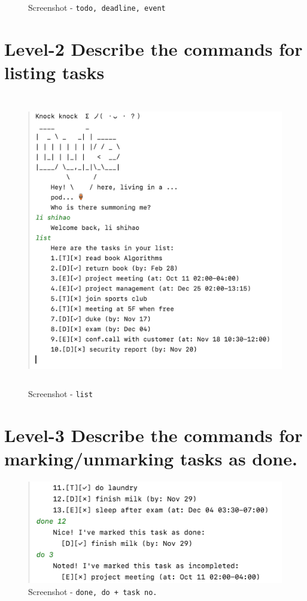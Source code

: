 \documentclass[a4paper,11pt, twoside]{article}
\begin{document}
\begin{table} [htbp]
\begin{figure}[H]
\caption{Screenshot - \texttt{todo, deadline, event}} 
\label{startold}
\end{figure} 

\section* {Level-2  Describe the commands for listing tasks} 

\begin{figure}[h]
\left
\includegraphics[height= 12.8cm]{list.png}
\caption{Screenshot - \texttt{list}} 
\label{startold}
\end{figure} 


\section* {Level-3 Describe the commands for marking/unmarking tasks as done.} 
\begin{figure}[h]
\left
\includegraphics[width = 11.4cm]{done.png}
\caption{Screenshot - \texttt{done, do + task no.}} 
\label{startold}
\end{figure} 


\end{table}
\end{document}
